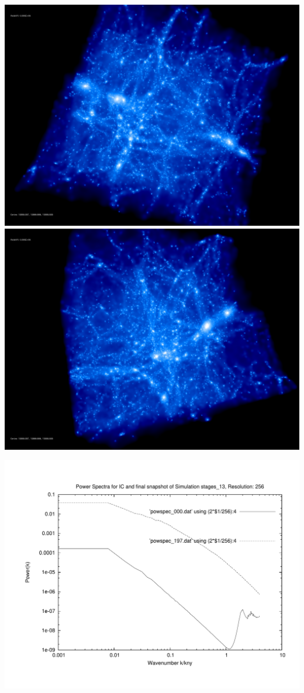 \includegraphics[scale=0.1]{r256/h100/stages_13/rotate_00074.jpg} 
\includegraphics[scale=0.1]{r256/h100/stages_13/rotate_00131.jpg}

\includegraphics[scale=0.5]{r256/h100/stages_13/plot_powspec_stages_13}

